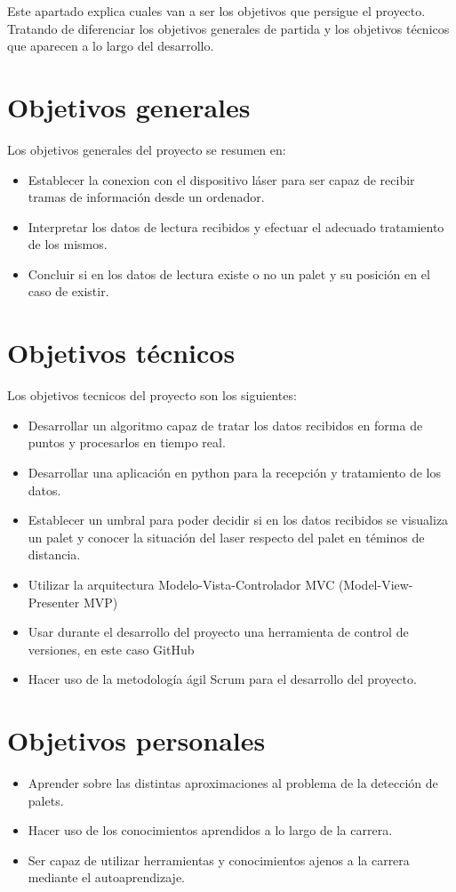 
Este apartado explica cuales van a ser los objetivos que persigue el proyecto. Tratando de diferenciar los objetivos generales de partida y los objetivos técnicos que aparecen a lo largo del desarrollo.

\section{Objetivos generales}
Los objetivos generales del proyecto se resumen en:
\begin{itemize}
	\item Establecer la conexion con el dispositivo láser para ser capaz de recibir tramas de información desde un ordenador.
	\item Interpretar los datos de lectura recibidos y efectuar el adecuado tratamiento de los mismos.
	\item Concluir si en los datos de lectura existe o no un palet y su posición en el caso de existir.
\end{itemize}

\section{Objetivos técnicos}
Los objetivos tecnicos del proyecto son los siguientes:
\begin{itemize}
	\item Desarrollar un algoritmo capaz de tratar los datos recibidos en forma de puntos y procesarlos en tiempo real.
	\item Desarrollar una aplicación en python para la recepción y tratamiento de los datos.
	\item Establecer un umbral para poder decidir si en los datos recibidos se visualiza un palet y conocer la situación del laser respecto del palet en téminos de distancia.
	\item Utilizar la arquitectura Modelo-Vista-Controlador MVC (Model-View-Presenter MVP)
	\item Usar durante el desarrollo del proyecto una herramienta de control de versiones, en este caso GitHub
	\item Hacer uso de la metodología ágil Scrum para el desarrollo del proyecto.
\end{itemize}

\section{Objetivos personales}
\begin{itemize}
\item Aprender sobre las distintas aproximaciones al problema de la detección de palets.
\item Hacer uso de los conocimientos aprendidos a lo largo de la carrera.
\item Ser capaz de utilizar herramientas y conocimientos ajenos a la carrera mediante el autoaprendizaje.
\end{itemize}


